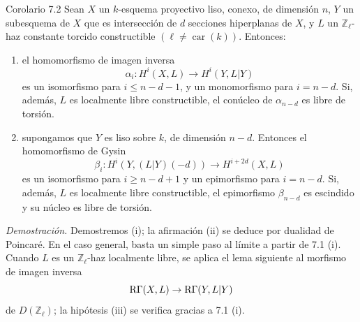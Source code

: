 \begin{statement}{Corolario 7.2}
Sean $X$ un $k$-esquema proyectivo liso, conexo, de dimensión $n$, $Y$ un subesquema de $X$ que es intersección de $d$ secciones hiperplanas de $X$, y $L$ un $\mathbb Z_\ell$-haz constante torcido constructible $(\ell\ne\operatorname{car}(k))$. Entonces:
\begin{enumerate}[label=(\roman*)]
\item el homomorfismo de imagen inversa
\[
\alpha_i:H^i(X,L)\to H^i(Y,L|Y)
\]
es un isomorfismo para $i\le n-d-1$, y un monomorfismo para $i=n-d$. Si, además, $L$ es localmente libre constructible, el conúcleo de $\alpha_{n-d}$ es libre de torsión.
\item supongamos que $Y$ es liso sobre $k$, de dimensión $n-d$. Entonces el homomorfismo de Gysin
\[
\beta_i:H^i(Y,(L|Y)(-d))\to H^{i+2d}(X,L)
\]
es un isomorfismo para $i\ge n-d+1$ y un epimorfismo para $i=n-d$. Si, además, $L$ es localmente libre constructible, el epimorfismo $\beta_{n-d}$ es escindido y su núcleo es libre de torsión.
\end{enumerate}
\end{statement}

\emph{Demostración.} Demostremos (i); la afirmación (ii) se deduce por dualidad de Poincaré. En el caso general, basta un simple paso al límite a partir de 7.1 (i). Cuando $L$ es un $\mathbb Z_\ell$-haz localmente libre, se aplica el lema siguiente al morfismo de imagen inversa
\[
\mathrm{R}\Gamma(X,L)\to \mathrm{R}\Gamma(Y,L|Y)
\]
de $D(\mathbb Z_\ell)$; la hipótesis (iii) se verifica gracias a 7.1 (i).

